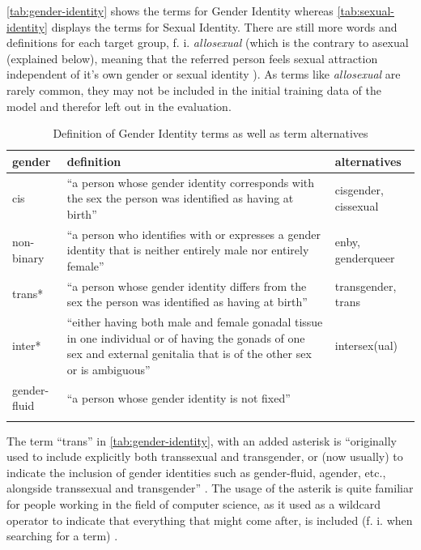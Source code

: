 \autoref{tab:gender-identity} shows the terms for Gender Identity whereas \autoref{tab:sexual-identity} displays the terms for Sexual Identity. There are still more words and definitions for each target group, f. i. \textit{allosexual} (which is the contrary to asexual (explained below), meaning that the referred person feels sexual attraction independent of it's own gender or sexual identity \citep{wiki:Allosexuality}). As terms like \textit{allosexual} are rarely common, they may not be included in the initial training data of the model and therefor left out in the evaluation.


\begin{longtable}{p{} p{} p{}}
        \textbf{gender} & \textbf{definition} & \textbf{alternatives}\\
        \toprule
        cis & \small\enquote{a person whose gender identity corresponds with the sex the person was identified as having at birth}  \citep{Oxf:cisgender} & \small cisgender, cissexual \\ \midrule
        non-binary & \small\enquote{a person who identifies with or expresses a gender identity that is neither entirely male nor entirely female} \citep{Oxf:nonbinary} &  \small enby, genderqueer \\ \midrule
        trans* & \small\enquote{a person whose gender identity differs from the sex the person was identified as having at birth} \citep{Oxf:trans} &  \small transgender, trans\\ \midrule
        inter* & \small\enquote{either having both male and female gonadal tissue in one individual or of having the gonads of one sex and external genitalia that is of the other sex or is ambiguous} \citep{Oxf:intersexuality} &  \small intersex(ual)\\ \midrule
        gender-fluid & \small\enquote{a person whose gender identity is not fixed} \citep{Oxf:gender-fluid} &  \\ \midrule

    \caption[Gender Identity Terms]{Definition of Gender Identity terms as well as term alternatives}
    \label{tab:gender-identity}
\end{longtable}

The term \enquote{trans} in \autoref{tab:gender-identity}, with an added asterisk is \enquote{originally used to include explicitly both transsexual and transgender, or (now usually) to indicate the inclusion of gender identities such as gender-fluid, agender, etc., alongside transsexual and transgender} \citep{trans2}. The usage of the asterik is quite familiar for people working in the field of computer science, as it used as a wildcard operator to indicate that everything that might come after, is included (f. i. when searching for a term) \citep{asterisk}.  

